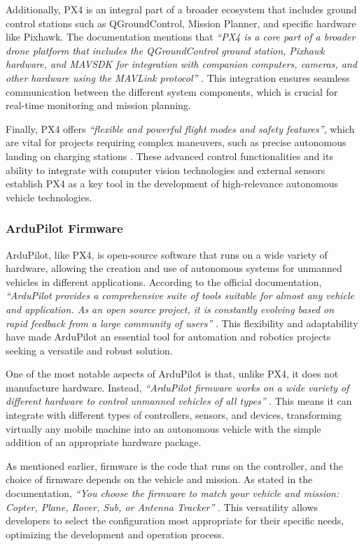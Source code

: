 Additionally, PX4 is an integral part of a broader ecosystem that includes ground control stations such as QGroundControl, Mission Planner, and specific hardware like Pixhawk. The documentation mentions that \textit{``PX4 is a core part of a broader drone platform that includes the QGroundControl ground station, Pixhawk hardware, and MAVSDK for integration with companion computers, cameras, and other hardware using the MAVLink protocol''} \cite{px4_docs}. This integration ensures seamless communication between the different system components, which is crucial for real-time monitoring and mission planning.

Finally, PX4 offers \textit{``flexible and powerful flight modes and safety features''}, which are vital for projects requiring complex maneuvers, such as precise autonomous landing on charging stations \cite{px4_docs}. These advanced control functionalities and its ability to integrate with computer vision technologies and external sensors establish PX4 as a key tool in the development of high-relevance autonomous vehicle technologies.

\subsubsection{ArduPilot Firmware}
ArduPilot, like PX4, is open-source software that runs on a wide variety of hardware, allowing the creation and use of autonomous systems for unmanned vehicles in different applications. According to the official documentation, \textit{“ArduPilot provides a comprehensive suite of tools suitable for almost any vehicle and application. As an open source project, it is constantly evolving based on rapid feedback from a large community of users”} \cite{ardupilot_docs}. This flexibility and adaptability have made ArduPilot an essential tool for automation and robotics projects seeking a versatile and robust solution.

One of the most notable aspects of ArduPilot is that, unlike PX4, it does not manufacture hardware. Instead, \textit{“ArduPilot firmware works on a wide variety of different hardware to control unmanned vehicles of all types”} \cite{ardupilot_docs}. This means it can integrate with different types of controllers, sensors, and devices, transforming virtually any mobile machine into an autonomous vehicle with the simple addition of an appropriate hardware package.

As mentioned earlier, firmware is the code that runs on the controller, and the choice of firmware depends on the vehicle and mission. As stated in the documentation, \textit{“You choose the firmware to match your vehicle and mission: Copter, Plane, Rover, Sub, or Antenna Tracker”} \cite{ardupilot_docs}. This versatility allows developers to select the configuration most appropriate for their specific needs, optimizing the development and operation process.

